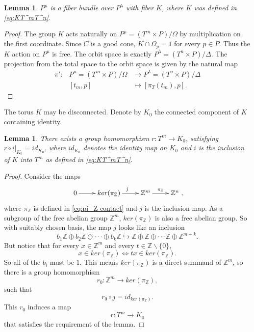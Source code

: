 \documentclass[12pt]{amsart}
\newtheorem{lemma}[theorem]{Lemma}
\theoremstyle{definition}
\numberwithin{equation}{section}
\begin{document}
\begin{lemma}\label{lemma:fiberK}
$P^{\mu}$ is a fiber bundle over $P^{\lambda}$ with fiber $K$, where
$K$ was defined in \eqref{eq:KT^mT^n}.
\end{lemma}
\begin{proof} The group $K$ acts naturally on $P^{\mu}=(T^m\times
P)/\Omega$ by multiplication on the first coordinate. Since $C$ is a
good cone, $K\cap \Omega_{p}=1$ for every $p\in P$.
 Thus
the $K$ action on $P^{\mu}$ is free. The orbit space is exactly
$P^{\lambda}=(T^n\times P)/\Delta$. The projection from the total
space to the orbit space is given by the natural map
\begin{eqnarray*}\pi':& P^{\mu}=(T^m\times P)/\Omega&\rightarrow
P^{\lambda}=(T^n\times P)/\Delta\\     &[t_{m},p]&\mapsto
[\pi_{T}(t_{m}),p].
\end{eqnarray*}
\end{proof}

The torus $K$ may be disconnected. Denote by $K_{0}$ the connected
component of $K$ containing identity.

\begin{lemma}\label{lemma:torus retraction}
 There exists a group homomorphism $r: T^m\rightarrow K_{0}$,
 satisfying
$r\circ i|_{K_{0}}=id_{K_{0}}$, where $id_{K_{0}}$ denotes the
identity map on $K_{0}$ and $i$ is the inclusion of $K$ into $T^m$
as defined in \eqref{eq:KT^mT^n}.
 \end{lemma}
\begin{proof}Consider the
maps\[\xymatrix{
  0 \ar[r]^{} & ker(\pi_{{\mathbb{Z}}}) \ar[r]^{j} & {{\mathbb{Z}}}^m \ar[r]^{\pi_{{\mathbb{Z}}}} & {{\mathbb{Z}}}^n
  },\]
  where $\pi_{{\mathbb{Z}}}$ is defined in \eqref{eq:pi_Z contact} and $j$ is
  the inclusion map.
  As a subgroup of the free abelian group ${{\mathbb{Z}}}^m$, $ker(\pi_{{\mathbb{Z}}})$ is
  also a free abelian group. So with suitably chosen basis, the
  map $j$ looks like an inclusion \[b_{1}{{\mathbb{Z}}}\oplus b_{2}{{\mathbb{Z}}}\oplus \cdot\cdot\cdot \oplus b_{k}{{\mathbb{Z}}}
  \hookrightarrow {{\mathbb{Z}}}\oplus{{\mathbb{Z}}}\oplus \cdot\cdot\cdot {{\mathbb{Z}}}\oplus
  {{\mathbb{Z}}}^{m-k}.\]
  But notice that for every $x\in {{\mathbb{Z}}}^m$ and every $t\in {{\mathbb{Z}}}\backslash\{0\}$, \[x\in ker(\pi_{{\mathbb{Z}}})\Leftrightarrow tx\in
  ker(\pi_{{\mathbb{Z}}}).\]
  So all of the $b_{i}$ must be $1$. This means
  $ker(\pi_{{\mathbb{Z}}})$ is a direct summand of ${{\mathbb{Z}}}^m$, so there is a group homomorphism \begin{equation}
  r_{0}:{{\mathbb{Z}}}^m\rightarrow
  ker(\pi_{{\mathbb{Z}}}),\end{equation}
  such that
  \[r_{0}\circ j = id_{ker(\pi_{{\mathbb{Z}}})}.\]
   This
  $r_{0}$ induces a map
\begin{equation}\label{eq:torus retraction}
r: T^m\rightarrow K_{0}
\end{equation}
that satisfies the requirement of the lemma.
  \end{proof}
\end{document}
